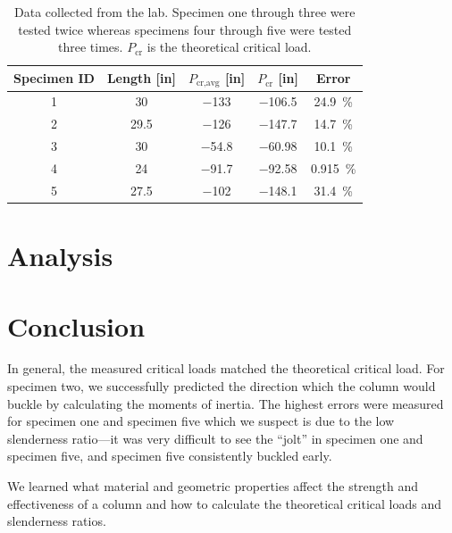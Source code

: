 \documentclass[12 pt]{article}
\begin{document}
\begin{table}[!htbp]
\caption{Data collected from the lab. Specimen one through three were tested twice whereas specimens four through five were tested three times. $P_\text{cr}$ is the theoretical critical load.}
\begin{center}
	\begin{tabular}{|c|c|c|c|c|}
		\hline
		Specimen ID&Length [\unit{in}]&$P_\text{cr,avg}$ [\unit{in}]&$P_\text{cr}$ [\unit{in}]&Error\\
		\hline
		\num{1}&\num{30}&\num{-133}&\num{-106.5}&\qty{24.9}{\percent}\\
		\hline
		\num{2}&\num{29.5}&\num{-126}&\num{-147.7}&\qty{14.7}{\percent}\\
		\hline
		\num{3}&\num{30}&\num{-54.8}&\num{-60.98}&\qty{10.1}{\percent}\\
		\hline
		\num{4}&\num{24}&\num{-91.7}&\num{-92.58}&\qty{0.915}{\percent}\\
		\hline
		\num{5}&\num{27.5}&\num{-102}&\num{-148.1}&\qty{31.4}{\percent}\\
		\hline
	\end{tabular}
\end{center}
\label{tbl:data}
\end{table}

\section{Analysis} \label{analysis}

\section{Conclusion} \label{conclusion}
In general, the measured critical loads matched the theoretical critical load. For specimen two, we successfully predicted the direction which the column would buckle by calculating the moments of inertia. The highest errors were measured for specimen one and specimen five which we suspect is due to the low slenderness ratio---it was very difficult to see the ``jolt'' in specimen one and specimen five, and specimen five consistently buckled early.

We learned what material and geometric properties affect the strength and effectiveness of a column and how to calculate the theoretical critical loads and slenderness ratios.
\end{document}
